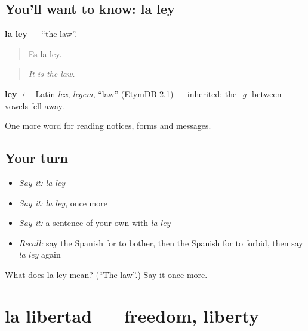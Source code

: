 \subsection*{You'll want to know: la ley}
\textbf{la ley} — \textquotedblleft{}the law\textquotedblright{}.

\begin{quote}
Es la ley.
\end{quote}

\begin{quote}
\emph{It is the law.}
\end{quote}

\begin{cousinweb}
\textbf{ley} $\leftarrow$ Latin \emph{lex}, \emph{legem}, \textquotedblleft{}law\textquotedblright{} (EtymDB 2.1) — inherited: the \emph{-g-} between vowels fell away.
\end{cousinweb}

\begin{grammarlens}[title={What you've built}]
One more word for reading notices, forms and messages.
\end{grammarlens}

\subsection*{Your turn}
\begin{itemize}
\raggedright
  \item \emph{Say it:} \emph{la ley}
  \item \emph{Say it:} \emph{la ley}, once more
  \item \emph{Say it:} a sentence of your own with \emph{la ley}
  \item \emph{Recall:} say the Spanish for to bother, then the Spanish for to forbid, then say \emph{la ley} again
\end{itemize}

\begin{tcolorbox}[breakable,colback=teal!4,colframe=teal!35!black,title={Before you move on}]
What does la ley mean? (\textquotedblleft{}The law\textquotedblright{}.) Say it once more.
\end{tcolorbox}
\section[la libertad]{la libertad — freedom, liberty}

\label{lesson:ES-C500-libertad}



